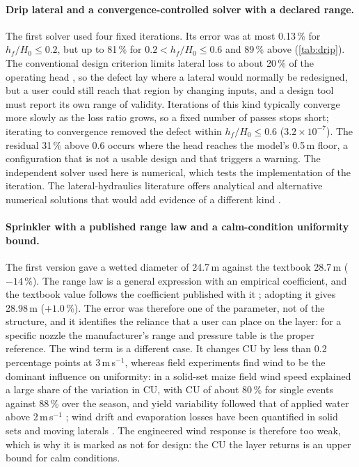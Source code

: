 \paragraph{Drip lateral and a convergence-controlled solver with a declared range.} The first solver used four fixed iterations. Its error was at most 0.13\,\% for $h_f/H_0\le0.2$, but up to 81\,\% for $0.2<h_f/H_0\le0.6$ and 89\,\% above (\cref{tab:drip}). The conventional design criterion limits lateral loss to about 20\,\% of the operating head \citep{KellerKarmeli1974,Keller1990}, so the defect lay where a lateral would normally be redesigned, but a user could still reach that region by changing inputs, and a design tool must report its own range of validity. Iterations of this kind typically converge more slowly as the loss ratio grows, so a fixed number of passes stops short; iterating to convergence removed the defect within $h_f/H_0\le0.6$ ($3.2\times10^{-7}$). The residual 31\,\% above 0.6 occurs where the head reaches the model's 0.5\,m floor, a configuration that is not a usable design and that triggers a warning. The independent solver used here is numerical, which tests the implementation of the iteration. The lateral-hydraulics literature offers analytical and alternative numerical solutions that would add evidence of a different kind \citep{Warrick1988,Scaloppi1993}.

\paragraph{Sprinkler with a published range law and a calm-condition uniformity bound.} The first version gave a wetted diameter of 24.7\,m against the textbook 28.7\,m ($-14$\,\%). The range law is a general expression with an empirical coefficient, and the textbook value follows the coefficient published with it \citep{Keller1990}; adopting it gives 28.98\,m ($+1.0$\,\%). The error was therefore one of the parameter, not of the structure, and it identifies the reliance that a user can place on the layer: for a specific nozzle the manufacturer's range and pressure table is the proper reference. The wind term is a different case. It changes CU by less than 0.2 percentage points at $3$\,m\,s$^{-1}$, whereas field experiments find wind to be the dominant influence on uniformity: in a solid-set maize field wind speed explained a large share of the variation in CU, with CU of about 80\,\% for single events against 88\,\% over the season, and yield variability followed that of applied water above 2\,m\,s$^{-1}$ \citep{Dechmi2003}; wind drift and evaporation losses have been quantified in solid sets and moving laterals \citep{Playan2005}. The engineered wind response is therefore too weak, which is why it is marked as not for design: the CU the layer returns is an upper bound for calm conditions.

